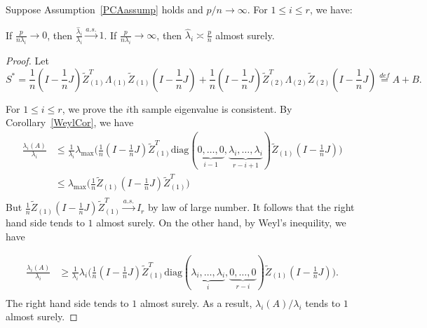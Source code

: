 \begin{theorem}
    Suppose Assumption~\ref{PCAassump} holds and $p/n\to \infty$.
    For $1\leq i\leq r$, we have:

    If  $\frac{p}{n\lambda_i}\to 0$, then
    $\frac{\hat{\lambda}_i}{\lambda_i}\xrightarrow{a.s.} 1$.
    If  $\frac{p}{n\lambda_i}\to \infty$, then
    $\hat{\lambda}_i\asymp\frac{p}{n}$ almost surely.
\end{theorem}
\begin{proof}
    Let
    \begin{equation*}
        S^*=\frac{1}{n}(I-\frac{1}{n}J)\tilde{Z}_{(1)}^T \Lambda_{(1)} \tilde{Z}_{(1)} (I-\frac{1}{n}J)+\frac{1}{n}(I-\frac{1}{n}J)\tilde{Z}_{(2)}^T \Lambda_{(2)} \tilde{Z}_{(2)} (I-\frac{1}{n}J)\overset{def}{=}A+B.
    \end{equation*}

    For $1\leq i\leq r$, we prove the $i$th sample eigenvalue is consistent. By Corollary~\ref{WeylCor}, we have
    \begin{equation*}
        \begin{aligned}
            \frac{\lambda_i(A)}{\lambda_i}&\leq \frac{1}{\lambda_i}\lambda_{\max}\Big(\frac{1}{n}(I-\frac{1}{n}J)\tilde{Z}_{(1)}^T \mathrm{diag}(\underbrace{0,\ldots,0}_{i-1},\underbrace{\lambda_i,\ldots,\lambda_i}_{r-i+1}) \tilde{Z}_{(1)} (I-\frac{1}{n}J)\Big)\\
            &\leq \lambda_{\max}\Big(\frac{1}{n} \tilde{Z}_{(1)} (I-\frac{1}{n}J)\tilde{Z}_{(1)}^T \Big)\\
        \end{aligned}
    \end{equation*}
    But $\frac{1}{n}\tilde{Z}_{(1)} (I-\frac{1}{n}J)\tilde{Z}_{(1)}^T\xrightarrow{a.s.}I_r$ by law of large number. It follows that the right hand side tends to $1$ almost surely. On the other hand, by Weyl's inequility, we have

\begin{equation*}
    \begin{aligned}
        \frac{\lambda_i(A)}{\lambda_i}&\geq
        \frac{1}{\lambda_i}\lambda_{i}\Big(\frac{1}{n}(I-\frac{1}{n}J)\tilde{Z}_{(1)}^T \mathrm{diag}(\underbrace{\lambda_i,\ldots,\lambda_i}_{i},\underbrace{0,\ldots,0}_{r-i}) \tilde{Z}_{(1)} (I-\frac{1}{n}J)\Big).\\
    \end{aligned}
\end{equation*}
    The right hand side tends to $1$ almost surely. As a result, $\lambda_i(A)/\lambda_i$ tends to $1$ almost surely.



\end{proof}
